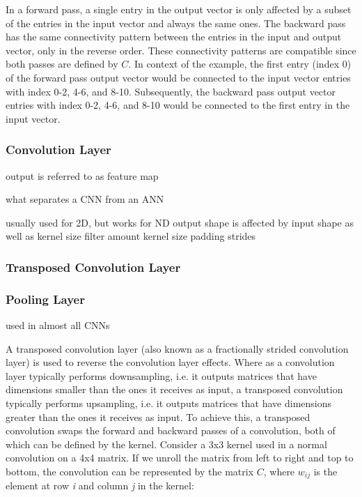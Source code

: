 \noindent In a forward pass, a single entry in the output vector is only affected by a subset of the entries in the input vector and always the same ones. The backward pass has the same connectivity pattern between the entries in the input and output vector, only in the reverse order. These connectivity patterns are compatible since both passes are defined by $C$. In context of the example, the first entry (index 0) of the forward pass output vector would be connected to the input vector entries with index 0-2, 4-6, and 8-10. Subsequently, the backward pass output vector entries with index 0-2, 4-6, and 8-10 would be connected to the first entry in the input vector.\\

\subsubsection{Convolution Layer}

output is referred to as feature map

what separates a CNN from an ANN

usually used for 2D, but works for ND
output shape is affected by input shape as well as kernel size
filter amount
kernel size
padding
strides


\subsubsection{Transposed Convolution Layer}


\subsubsection{Pooling Layer}

used in almost all CNNs


\noindent A transposed convolution layer (also known as a fractionally strided convolution layer) is used to reverse the convolution layer effects. Where as a convolution layer typically performs downsampling, i.e. it outputs matrices that have dimensions smaller than the ones it receives as input, a transposed convolution typically performs upsampling, i.e. it outputs matrices that have dimensions greater than the ones it receives as input. To achieve this, a transposed convolution swaps the forward and backward passes of a convolution, both of which can be defined by the kernel. Consider a 3x3 kernel used in a normal convolution on a 4x4 matrix. If we unroll the matrix from left to right and top to bottom, the convolution can be represented by the matrix $C$, where \textit{$w_{ij}$} is the element at row \textit{i} and column \textit{j} in the kernel:

